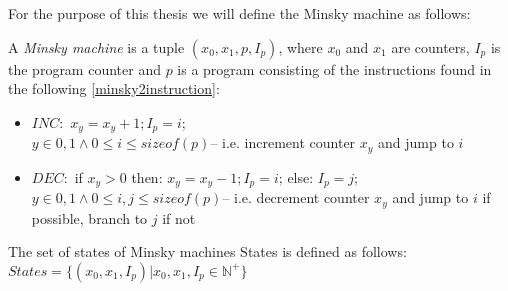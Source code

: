 For the purpose of this thesis we will define the Minsky machine as follows:
\begin{definition}
A \emph{Minsky machine} is a tuple $(x_0, x_1, p, I_p)$, where $x_0$ and $x_1$ are counters, $I_p$ is the program counter and $p$ is a program consisting of the instructions found in the following \autoref{minsky2instruction}:
\begin{instructionset}
\label{minsky2instruction}
\hfill
\begin{itemize}
\item{$INC:$} $x_y = x_y + 1; I_p = i$;
\\ $ y\in{0,1} \land 0 \leq i \leq sizeof(p)$\hfill\break -- i.e. increment counter $x_y$ and jump to $i$
\item{$DEC:$} if $x_y > 0$ then: $x_y = x_y - 1; I_p = i$; else: $I_p = j$;\\
$ y\in{0,1} \land 0 \leq i,j \leq sizeof(p)$\hfill\break -- i.e. decrement counter $x_y$ and jump to $i$ if possible, branch to $j$ if not
\end{itemize}
\end{instructionset}

The set of states of Minsky machines States is defined as follows:
$States = \{(x_0, x_1, I_p) | x_0, x_1, I_p \in\mathbb{N}^+\}$
\end{definition}

